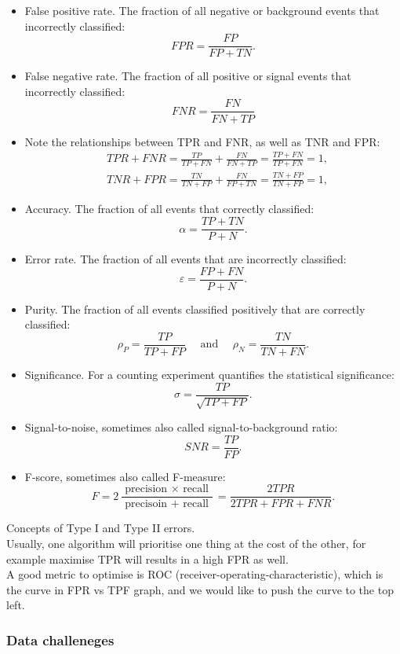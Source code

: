 \documentclass[12pt,a4paper]{article}
\begin{document}
\begin{itemize}
    \item False positive rate. The fraction of all negative or background events that incorrectly classified:
    $$
    F P R=\frac{F P}{F P+T N} .
    $$
    \item False negative rate. The fraction of all positive or signal events that incorrectly classified:
    $$
    F N R=\frac{F N}{F N+T P}
    $$
    \item Note the relationships between TPR and FNR, as well as TNR and FPR:
    $$
    \begin{aligned}
    & T P R+F N R=\frac{T P}{T P+F N}+\frac{F N}{F N+T P}=\frac{T P+F N}{T P+F N}=1, \\
    & T N R+F P R=\frac{T N}{T N+F P}+\frac{F N}{F P+T N}=\frac{T N+F P}{T N+F P}=1,
    \end{aligned}
    $$
    \item Accuracy. The fraction of all events that correctly classified:
    $$
    \alpha=\frac{T P+T N}{P+N} .
    $$
    \item Error rate. The fraction of all events that are incorrectly classified:
    $$
    \varepsilon=\frac{F P+F N}{P+N} .
    $$
    \item Purity. The fraction of all events classified positively that are correctly classified:
    $$
    \rho_P=\frac{T P}{T P+F P} \quad \text { and } \quad \rho_N=\frac{T N}{T N+F N} .
    $$
    \item Significance. For a counting experiment quantifies the statistical significance:
    $$
    \sigma=\frac{T P}{\sqrt{T P+F P}} .
    $$
    \item Signal-to-noise, sometimes also called signal-to-background ratio:
    $$
    S N R=\frac{T P}{F P} .
    $$
    \item F-score, sometimes also called F-measure:
    $$
    F=2 \frac{\text { precision } \times \text { recall }}{\text { precisoin }+ \text { recall }}=\frac{2 T P R}{2 T P R+F P R+F N R} .
    $$
\end{itemize}

Concepts of Type I and Type II errors.\\
Usually, one algorithm will prioritise one thing at the cost of the other, for example maximise TPR will results in a high FPR as well.\\
A good metric to optimise is ROC (receiver-operating-characteristic), which is the curve in FPR vs TPF graph, and we would like to push the curve to the top left.
\subsubsection{Data challeneges}
\end{document}
